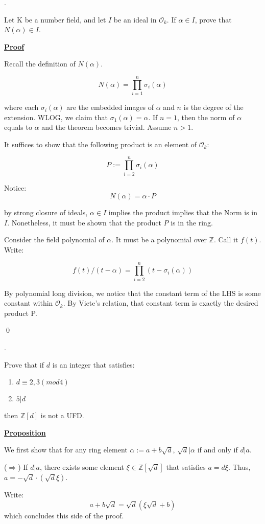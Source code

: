 \documentclass{article}
\newcommand{\new}[1]{
    \vspace{2mm}
    \noindent
    \textbf{
    \underline{#1}}
}
\def\calO{{\mathcal{O}}}
\def\ZZ{{\mathbb{Z}}}
\newcounter{problemcnt}
\newcommand{\nProblem}[1]{{
    \noindent
    \setcounter{problemcnt}{#1}
    \arabic{problemcnt}. 
}
}
\newcommand{\Proof}{{
    \vspace{2mm}
    \noindent
    \textbf{
    \underline{Proof}}
}
}
\begin{document}
\nProblem{2}
Let K be a number field,
and let $I$ be an ideal in $\calO_k$. 
If $\alpha \in I$, prove that 
$N(\alpha) \in I$. 


\Proof 

Recall the definition of $N(\alpha)$.

\[
    N(\alpha) = 
    \prod_{i = 1}^{n}{\sigma_i(\alpha)}
\]

where each $\sigma_i(\alpha)$ are the 
embedded images of $\alpha$ and 
$n$ is the degree of the extension. 
WLOG, we claim that $\sigma_1(\alpha) = 
\alpha$. If $n = 1$, then the norm of 
$\alpha$ equals to $\alpha$ and the 
theorem becomes trivial. Assume $n>1$. 

It suffices to show that the 
following product is an element of 
$\calO_k$:

\[
P := 
    \prod_{i = 2}^{n}{\sigma_i(\alpha)}
    \]

Notice:
\[
    N(\alpha) = \alpha \cdot P
\]

by strong closure of ideals, 
$\alpha \in I$ implies the product 
implies that the Norm is in $I$. Nonetheless, 
it must be shown that the product 
$P$ is in the ring.

Consider the field polynomial of $\alpha$. 
It must be a polynomial over $\mathbb{Z}$. 
Call it $f(t)$. Write:

\[
    f(t)/(t-\alpha) = 
    \prod_{i = 2}^{n}
    (t - \sigma_i(\alpha))
\]

By polynomial long division, we notice 
that the constant term of the LHS is 
some constant within $\calO_k$. By 
Viete's relation, that constant term 
is exactly the desired product P. 

\qed


\nProblem{5}
Prove that if $d$ is an integer that satisfies:
\begin{enumerate}
    \item $d \equiv 2, 3 (mod4)$
    \item $5|d$
\end{enumerate}
then $\ZZ[d]$ is not a UFD.  

\new{Proposition}
We first show that for any ring element 
$\alpha := a+b\sqrt{d}$, $\sqrt{d}|\alpha$ if and only if 
$d|a$. 

($\Rightarrow$) If $d|a$, there exists some 
element $\xi \in \mathbb{Z}[\sqrt{d}]$
that satisfies $a = d\xi$. Thus, 
$a = -\sqrt{d}\cdot (\sqrt{d}\xi)$. 

Write:
\[
    a + b\sqrt{d} = 
    \sqrt{d}
    (\xi\sqrt{d} + b)
\]
which concludes this side of the proof. 
\end{document}

